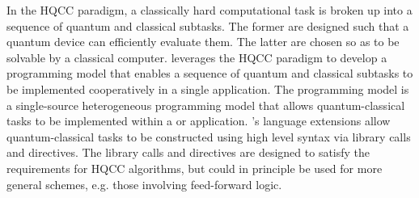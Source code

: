 In the \ac{HQCC} paradigm, a classically hard computational task is broken up into a sequence of quantum and classical subtasks. The former are designed such that a quantum device can efficiently evaluate them. The latter are chosen so as to be solvable by a classical computer. 
\qcor leverages the \ac{HQCC} paradigm to develop a programming model that enables a sequence of quantum and classical subtasks to be implemented cooperatively in a single application. The \qcor programming model is a single-source heterogeneous programming model that allows quantum-classical tasks to be implemented within a \Clang or \Cpp application. \qcor's language extensions allow quantum-classical tasks to be constructed using high level \CorCpp syntax via library calls and directives. The library calls and directives are designed to satisfy the requirements for \ac{HQCC} algorithms, but could in principle be used for more general schemes, e.g. those involving feed-forward logic. 
